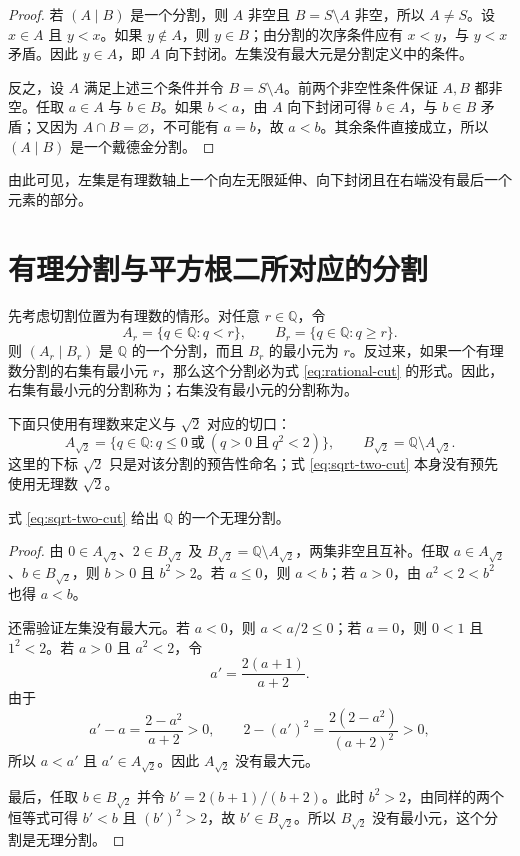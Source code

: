 \documentclass[UTF8,12pt,a4paper,fontset=fandol]{ctexbook}
\begin{document}
\begin{proof}
若 $(A\mid B)$ 是一个分割，则 $A$ 非空且 $B=S\setminus A$ 非空，所以 $A\ne S$。设 $x\in A$ 且 $y<x$。如果 $y\notin A$，则 $y\in B$；由分割的次序条件应有 $x<y$，与 $y<x$ 矛盾。因此 $y\in A$，即 $A$ 向下封闭。左集没有最大元是分割定义中的条件。

反之，设 $A$ 满足上述三个条件并令 $B=S\setminus A$。前两个非空性条件保证 $A,B$ 都非空。任取 $a\in A$ 与 $b\in B$。如果 $b<a$，由 $A$ 向下封闭可得 $b\in A$，与 $b\in B$ 矛盾；又因为 $A\cap B=\varnothing$，不可能有 $a=b$，故 $a<b$。其余条件直接成立，所以 $(A\mid B)$ 是一个戴德金分割。
\end{proof}

由此可见，左集是有理数轴上一个向左无限延伸、向下封闭且在右端没有最后一个元素的部分。

\section{有理分割与平方根二所对应的分割}

先考虑切割位置为有理数的情形。对任意 $r\in\mathbb{Q}$，令
\begin{equation}\label{eq:rational-cut}
  A_r=\{q\in\mathbb{Q}:q<r\},\qquad
  B_r=\{q\in\mathbb{Q}:q\ge r\}.
\end{equation}
则 $(A_r\mid B_r)$ 是 $\mathbb{Q}$ 的一个分割，而且 $B_r$ 的最小元为 $r$。反过来，如果一个有理数分割的右集有最小元 $r$，那么这个分割必为式 \eqref{eq:rational-cut} 的形式。因此，右集有最小元的分割称为；右集没有最小元的分割称为。

下面只使用有理数来定义与 $\sqrt{2}$ 对应的切口：
\begin{equation}\label{eq:sqrt-two-cut}
  A_{\sqrt{2}}
  =\{q\in\mathbb{Q}:q\le 0\ \text{或}\ (q>0\ \text{且}\ q^2<2)\},
  \qquad
  B_{\sqrt{2}}=\mathbb{Q}\setminus A_{\sqrt{2}}.
\end{equation}
这里的下标 $\sqrt{2}$ 只是对该分割的预告性命名；式 \eqref{eq:sqrt-two-cut} 本身没有预先使用无理数 $\sqrt{2}$。

\begin{proposition}
式 \eqref{eq:sqrt-two-cut} 给出 $\mathbb{Q}$ 的一个无理分割。
\end{proposition}

\begin{proof}
由 $0\in A_{\sqrt{2}}$、$2\in B_{\sqrt{2}}$ 及 $B_{\sqrt{2}}=\mathbb{Q}\setminus A_{\sqrt{2}}$，两集非空且互补。任取 $a\in A_{\sqrt{2}}$、$b\in B_{\sqrt{2}}$，则 $b>0$ 且 $b^2>2$。若 $a\le 0$，则 $a<b$；若 $a>0$，由 $a^2<2<b^2$ 也得 $a<b$。

还需验证左集没有最大元。若 $a<0$，则 $a<a/2\le 0$；若 $a=0$，则 $0<1$ 且 $1^2<2$。若 $a>0$ 且 $a^2<2$，令
\[
  a'=\frac{2(a+1)}{a+2}.
\]
由于
\[
  a'-a=\frac{2-a^2}{a+2}>0,
  \qquad
  2-(a')^2=\frac{2(2-a^2)}{(a+2)^2}>0,
\]
所以 $a<a'$ 且 $a'\in A_{\sqrt{2}}$。因此 $A_{\sqrt{2}}$ 没有最大元。

最后，任取 $b\in B_{\sqrt{2}}$ 并令 $b'=2(b+1)/(b+2)$。此时 $b^2>2$，由同样的两个恒等式可得 $b'<b$ 且 $(b')^2>2$，故 $b'\in B_{\sqrt{2}}$。所以 $B_{\sqrt{2}}$ 没有最小元，这个分割是无理分割。
\end{proof}
\end{document}
